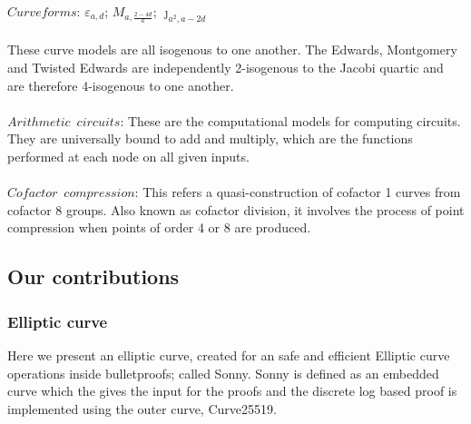 \documentclass{article}
\begin{document}
$Curve forms$: $\varepsilon_{a,d}$; ${M}_{a,\frac{2-4d}{a}}$; $\jmath_{a^{2},a-{2d}}$ \\\\ These curve models are all isogenous to one another. The Edwards, Montgomery and Twisted Edwards are independently 2-isogenous to the Jacobi quartic and are therefore 4-isogenous to one another.  \\\\
$Arithmetic$\ $circuits$: These are the computational models for computing circuits. They are universally bound to add and multiply, which are the functions performed at each node on all given inputs. \\\\
$Cofactor$\ $compression$: This refers a quasi-construction of cofactor 1 curves from cofactor 8 groups. Also known as cofactor division, it involves the process of point compression when points of order 4 or 8 are produced.\\ 

\subsection{Our contributions}
\subsubsection{Elliptic curve}
Here we present an elliptic curve, created for an safe and efficient Elliptic curve operations inside bulletproofs; called Sonny. Sonny is defined as an embedded curve which the gives the input for the proofs and the discrete log based proof is implemented using the outer curve, Curve25519. \\\\
\end{document}
